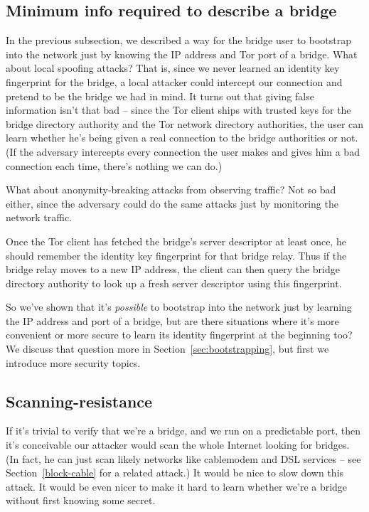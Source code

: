 \documentclass{llncs}
\begin{document}
\subsection{Minimum info required to describe a bridge}

In the previous subsection, we described a way for the bridge user
to bootstrap into the network just by knowing the IP address and
Tor port of a bridge. What about local spoofing attacks? That is,
since we never learned an identity key fingerprint for the bridge,
a local attacker could intercept our connection and pretend to be
the bridge we had in mind. It turns out that giving false information
isn't that bad -- since the Tor client ships with trusted keys for the
bridge directory authority and the Tor network directory authorities,
the user can learn whether he's being given a real connection to the
bridge authorities or not. (If the adversary intercepts every connection
the user makes and gives him a bad connection each time, there's nothing
we can do.)

What about anonymity-breaking attacks from observing traffic? Not so bad
either, since the adversary could do the same attacks just by monitoring
the network traffic.

Once the Tor client has fetched the bridge's server descriptor at least
once, he should remember the identity key fingerprint for that bridge
relay. Thus if the bridge relay moves to a new IP address, the client
can then query the bridge directory authority to look up a fresh server
descriptor using this fingerprint.

So we've shown that it's \emph{possible} to bootstrap into the network
just by learning the IP address and port of a bridge, but are there
situations where it's more convenient or more secure to learn its
identity fingerprint at the beginning too? We discuss that question
more in Section~\ref{sec:bootstrapping}, but first we introduce more
security topics.

\subsection{Scanning-resistance}

If it's trivial to verify that we're a bridge, and we run on a predictable
port, then it's conceivable our attacker would scan the whole Internet
looking for bridges. (In fact, he can just scan likely networks like
cablemodem and DSL services -- see Section~\ref{block-cable} for a related
attack.) It would be nice to slow down this attack. It would
be even nicer to make it hard to learn whether we're a bridge without
first knowing some secret.
\end{document}
